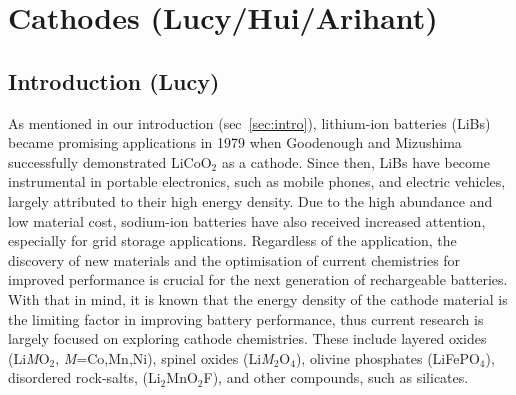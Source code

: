 \documentclass[../main.tex]{subfiles}
\begin{document}
\section{Cathodes (Lucy/Hui/Arihant)}
\label{sec:cathodes}

\subsection{Introduction (Lucy)}
\label{sec:cathode_intro}
As mentioned in our introduction (sec~\ref{sec:intro}), lithium-ion batteries (LiBs) became promising applications in 1979 when Goodenough and Mizushima successfully demonstrated LiCoO$_2$ as a cathode.\cite{mizushima1980lixcoo2} Since then, LiBs have become instrumental in portable electronics, such as mobile phones, and electric vehicles, \cite{rozier2015li, whittingham2008materials, dunn2011electrical, liu2013materials,palacin2009recent} largely attributed to their high energy density. \cite{masquelier2013polyanionic,armand2008building,bruce2012li,park2010review,scrosati2011lithium,goodenough_li-ion_2013,etacheri2011challenges,takada2013progress,fergus2010recent,ellis2010positive,he2012layered,zaghib2013review} Due to the high abundance and low material cost, sodium-ion batteries have also received increased attention, especially for grid storage applications. \cite{ellis2012curr,kim2012electrode,palomares2012ion,fergus2012ion,yabuuchi2012p2} Regardless of the application, the discovery of new materials and the optimisation of current chemistries for improved performance is crucial for the next generation of rechargeable batteries. With that in mind, it is known that the energy density of the cathode material is the limiting factor in improving battery performance, thus current research is largely focused on exploring cathode chemistries. These include layered oxides (Li\textit{M}O$_2$, \textit{M}=Co,Mn,Ni), spinel oxides (Li\textit{M}$_2$O$_4$), olivine phosphates (LiFePO$_4$), disordered rock-salts, (Li$_2$MnO$_2$F), and other compounds, such as silicates. \cite{daniel2014cathode, islam2014lithium}
\end{document}
